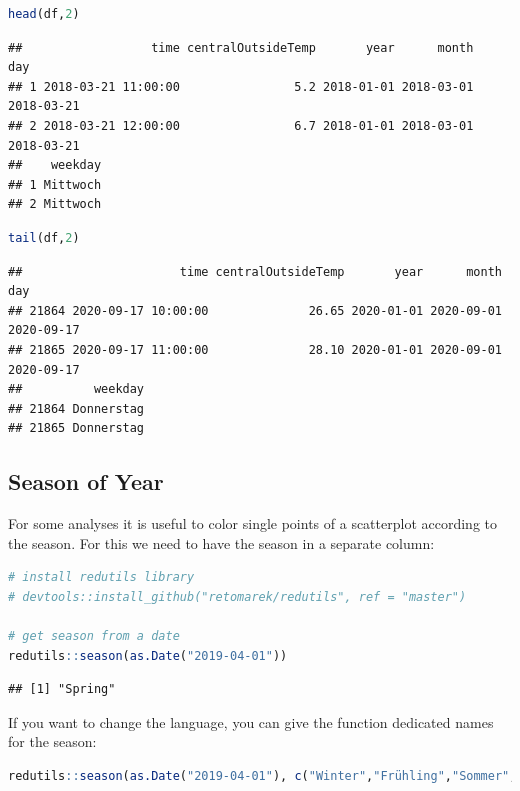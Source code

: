 \documentclass[
]{book}
\begin{document}
\begin{lstlisting}[language=R]
head(df,2)
\end{lstlisting}

\begin{lstlisting}
##                  time centralOutsideTemp       year      month        day
## 1 2018-03-21 11:00:00                5.2 2018-01-01 2018-03-01 2018-03-21
## 2 2018-03-21 12:00:00                6.7 2018-01-01 2018-03-01 2018-03-21
##    weekday
## 1 Mittwoch
## 2 Mittwoch
\end{lstlisting}

\begin{lstlisting}[language=R]
tail(df,2)
\end{lstlisting}

\begin{lstlisting}
##                      time centralOutsideTemp       year      month        day
## 21864 2020-09-17 10:00:00              26.65 2020-01-01 2020-09-01 2020-09-17
## 21865 2020-09-17 11:00:00              28.10 2020-01-01 2020-09-01 2020-09-17
##          weekday
## 21864 Donnerstag
## 21865 Donnerstag
\end{lstlisting}

\hypertarget{season-of-year}{%
\subsection{Season of Year}\label{season-of-year}}

For some analyses it is useful to color single points of a scatterplot according to the season. For this we need to have the season in a separate column:

\begin{lstlisting}[language=R]
# install redutils library
# devtools::install_github("retomarek/redutils", ref = "master")

# get season from a date
redutils::season(as.Date("2019-04-01"))
\end{lstlisting}

\begin{lstlisting}
## [1] "Spring"
\end{lstlisting}

If you want to change the language, you can give the function dedicated names for the season:

\begin{lstlisting}[language=R]
redutils::season(as.Date("2019-04-01"), c("Winter","Frühling","Sommer","Herbst"))
\end{lstlisting}
\end{document}
